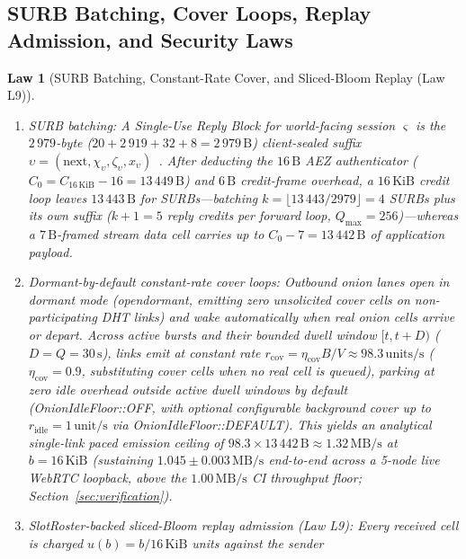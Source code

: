 \documentclass[journal]{IEEEtran}
\newtheorem{law}{Law}
\DeclareRobustCommand{\code}[1]{{\ttfamily\renewcommand{\_}{\textunderscore\allowbreak}#1}}
\begin{document}
\subsection{SURB Batching, Cover Loops, Replay Admission, and Security Laws}

\begin{law}[SURB Batching, Constant-Rate Cover, and Sliced-Bloom Replay (Law L9)]\label{law:surb-replay}
\leavevmode
\begin{enumerate}[leftmargin=1.5em]
\item \emph{SURB batching:} A Single-Use Reply Block for world-facing session
$\varsigma$ is the $2\,979$-byte ($20+2\,919+32+8=2\,979\,\mathrm{B}$) client-sealed suffix $\upsilon=(\mathrm{next},\allowbreak\chi_\upsilon,\allowbreak\zeta_\upsilon,\allowbreak x_\upsilon)$~\cite{Chaum1981,Danezis2003}.
After deducting the $16\,\mathrm{B}$ AEZ authenticator ($C_0=C_{16\,\mathrm{KiB}}-16=13\,449\,\mathrm{B}$) and $6\,\mathrm{B}$ credit-frame overhead, a $16\,\mathrm{KiB}$ credit loop leaves $13\,443\,\mathrm{B}$ for SURBs---batching $k=\lfloor 13\,443/2979\rfloor=4$ SURBs plus its own suffix ($k+1=5$ reply credits per forward loop, $Q_{\max}=256$)---whereas a $7\,\mathrm{B}$-framed stream data cell carries up to $C_0-7=13\,442\,\mathrm{B}$ of application payload.
\item \emph{Dormant-by-default constant-rate cover loops:} Outbound onion lanes open in dormant mode (\code{open\_dormant}, emitting zero unsolicited cover cells on non-participating DHT links) and wake automatically when real onion cells arrive or depart. Across active bursts and their bounded dwell window $[t,t+D)$ ($D=Q=30\,\mathrm{s}$), links emit at constant rate
$r_{\mathrm{cov}}=\eta_{\mathrm{cov}} B/V\approx 98.3\,\mathrm{units/s}$ ($\eta_{\mathrm{cov}}=0.9$, substituting cover cells when no real cell is
queued), parking at zero idle overhead outside active dwell windows by default (\code{OnionIdleFloor::OFF}, with optional configurable background cover up to $r_{\mathrm{idle}}=1\,\mathrm{unit/s}$ via \code{OnionIdleFloor::DEFAULT}). This yields an analytical single-link paced emission ceiling of $98.3\times 13\,442\,\mathrm{B}\approx 1.32\,\mathrm{MB/s}$ at $b=16\,\mathrm{KiB}$ (sustaining $1.045\pm 0.003\,\mathrm{MB/s}$ end-to-end across a 5-node live WebRTC loopback, above the $1.00\,\mathrm{MB/s}$ CI throughput floor; Section~\ref{sec:verification}).
\item \emph{\code{SlotRoster}-backed sliced-Bloom replay admission (Law L9):}
Every received cell is charged $u(b)=b/16\,\mathrm{KiB}$ units against the sender

\end{enumerate}
\end{law}
\end{document}
